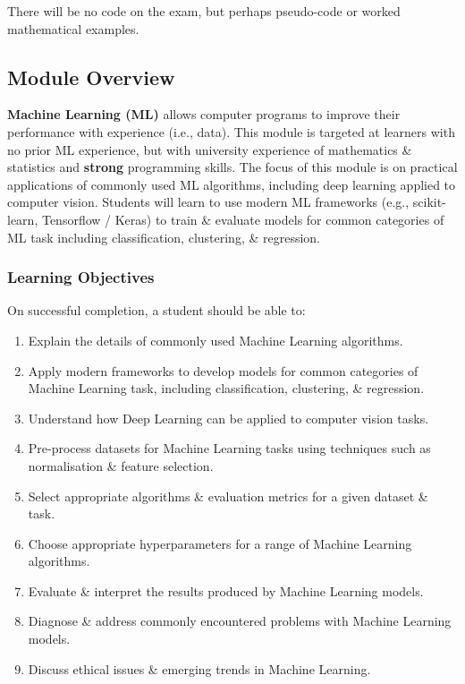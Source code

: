\documentclass[a4paper,11pt]{article}
\begin{document}
There will be no code on the exam, but perhaps pseudo-code or worked mathematical examples.

\subsection{Module Overview}
\textbf{Machine Learning (ML)} allows computer programs to improve their performance with experience (i.e., data).
This module is targeted at learners with no prior ML experience, but with university experience of mathematics \& 
statistics and \textbf{strong} programming skills.
The focus of this module is on practical applications of commonly used ML algorithms, including deep learning 
applied to computer vision.
Students will learn to use modern ML frameworks (e.g., scikit-learn, Tensorflow / Keras) to train \& evaluate 
models for common categories of ML task including classification, clustering, \& regression.

\subsubsection{Learning Objectives}
On successful completion, a student should be able to:
\begin{enumerate}
    \item   Explain the details of commonly used Machine Learning algorithms.
    \item   Apply modern frameworks to develop models for common categories of Machine Learning task, including
            classification, clustering, \& regression.
    \item   Understand how Deep Learning can be applied to computer vision tasks.
    \item   Pre-process datasets for Machine Learning tasks using techniques such as normalisation \& feature 
            selection.
    \item   Select appropriate algorithms \& evaluation metrics for a given dataset \& task.
    \item   Choose appropriate hyperparameters for a range of Machine Learning algorithms.
    \item   Evaluate \& interpret the results produced by Machine Learning models.
    \item   Diagnose \& address commonly encountered problems with Machine Learning models.
    \item   Discuss ethical issues \& emerging trends in Machine Learning.
\end{enumerate}
\end{document}
